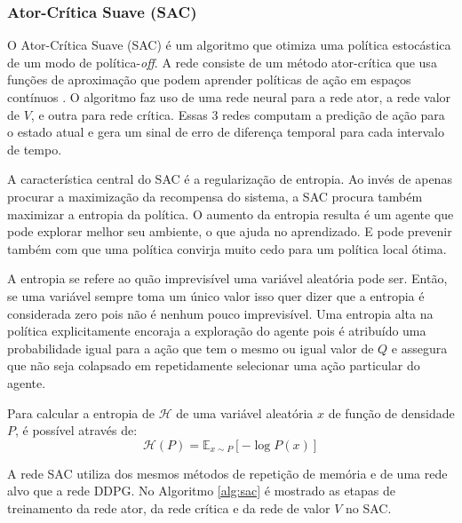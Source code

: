 \subsubsection{Ator-Crítica Suave (SAC)}

O Ator-Crítica Suave (SAC) é um algoritmo que otimiza uma política estocástica de um modo de política-\textit{off}. A rede consiste de um método ator-crítica que usa funções de aproximação que podem aprender políticas de ação em espaços contínuos \cite{haarnoja2018soft}.
O algoritmo faz uso de uma rede neural para a rede ator, a rede valor de $V$, e outra para rede crítica.
Essas 3 redes computam a predição de ação para o estado atual e gera um sinal de erro de diferença temporal para cada intervalo de tempo.

A característica central do SAC é a regularização de entropia.
Ao invés de apenas procurar a maximização da recompensa do sistema, a SAC procura também maximizar a entropia da política.
O aumento da entropia resulta é um agente que pode explorar melhor seu ambiente, o que ajuda no aprendizado. E pode prevenir também com que uma política convirja muito cedo para um política local ótima.

A entropia se refere ao quão imprevisível uma variável aleatória pode ser.
Então, se uma variável sempre toma um único valor isso quer dizer que a entropia é considerada zero pois não é nenhum pouco imprevisível.
Uma entropia alta na política explicitamente encoraja a exploração do agente pois é atribuído uma probabilidade igual para a ação que tem o mesmo ou igual valor de $Q$ e assegura que não seja colapsado em repetidamente selecionar uma ação particular do agente.

Para calcular a entropia de $\mathcal{H}$ de uma variável aleatória $x$ de função de densidade $P$, é possível através de:
\begin{equation}
    \mathcal{H}(P) = \mathbb{E}_{x \sim P} [-\log P(x)]
\end{equation}

A rede SAC utiliza dos mesmos métodos de repetição de memória e de uma rede alvo que a rede DDPG. No Algoritmo \ref{alg:sac} é mostrado as etapas de treinamento da rede ator, da rede crítica e da rede de valor $V$ no SAC.

